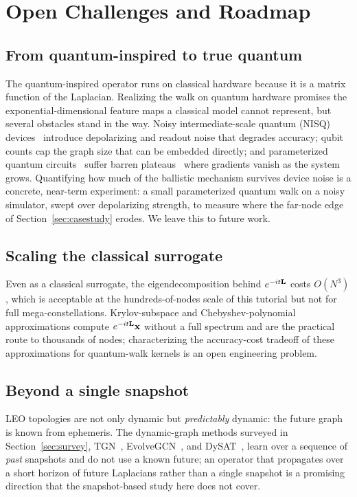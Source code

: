 \section{Open Challenges and Roadmap}
\label{sec:roadmap}

\subsection{From quantum-inspired to true quantum}
The quantum-inspired operator runs on classical hardware because it is a matrix
function of the Laplacian. Realizing the walk on quantum hardware promises the
exponential-dimensional feature maps a classical model cannot represent, but several
obstacles stand in the way. Noisy intermediate-scale quantum (NISQ) devices~\cite{preskill2018nisq} introduce
depolarizing and readout noise that degrades accuracy; qubit counts cap the graph size
that can be embedded directly; and parameterized quantum
circuits~\cite{cerezo2021vqa} suffer barren
plateaus~\cite{mcclean2018barren} where gradients vanish as the system grows. Quantifying how much of the
ballistic mechanism survives device noise is a concrete, near-term experiment: a small
parameterized quantum walk on a noisy simulator, swept over depolarizing strength, to
measure where the far-node edge of Section~\ref{sec:casestudy} erodes. We leave this to
future work.

\subsection{Scaling the classical surrogate}
Even as a classical surrogate, the eigendecomposition behind $e^{-it\mathbf{L}}$ costs
$O(N^3)$, which is acceptable at the hundreds-of-nodes scale of this tutorial but not
for full mega-constellations. Krylov-subspace and Chebyshev-polynomial approximations
compute $e^{-it\mathbf{L}}\mathbf{x}$ without a full spectrum and are the practical route to
thousands of nodes; characterizing the accuracy-cost tradeoff of these approximations
for quantum-walk kernels is an open engineering problem.

\subsection{Beyond a single snapshot}
LEO topologies are not only dynamic but \emph{predictably} dynamic: the future graph
is known from ephemeris. The dynamic-graph methods surveyed in
Section~\ref{sec:survey}, TGN~\cite{rossi2020tgn}, EvolveGCN~\cite{pareja2020evolvegcn},
and DySAT~\cite{sankar2020dysat}, learn over a sequence of \emph{past} snapshots and do
not use a known future; an operator that propagates over a short horizon of future
Laplacians rather than a single snapshot is a promising direction that the snapshot-based
study here does not cover.

